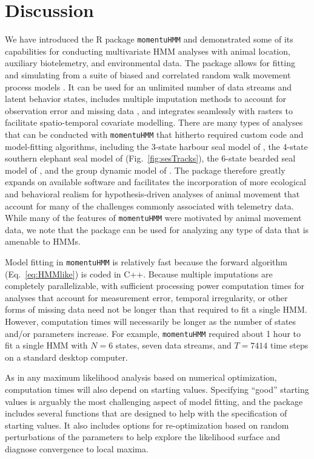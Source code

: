 \documentclass[12pt]{article}\usepackage[]{graphicx}\usepackage[]{color}
\begin{document}
\section{Discussion}
\label{sec:discuss}
We have introduced the R package \verb|momentuHMM| and demonstrated some of its capabilities for conducting multivariate HMM analyses with animal location, auxiliary biotelemetry, and environmental data. The package allows for fitting and simulating from a suite of biased and correlated random walk movement process models \citep[e.g.][]{McClintockEtAl2012}. It can be used for an unlimited number of data streams and latent behavior states, includes multiple imputation methods to account for observation error and missing data%
, and integrates seamlessly with rasters to facilitate spatio-temporal covariate modelling. There are many types of analyses that can be conducted with \verb|momentuHMM| that hitherto required custom code and model-fitting algorithms, including the 3-state harbour seal model of \cite{McClintockEtAl2013c}, the 4-state southern elephant seal model of \cite{MichelotEtAl2017} (Fig.\ \ref{fig:sesTracks}), the 6-state bearded seal model of \cite{McClintockEtAl2017}, and the group dynamic model of \cite{LangrockEtAl2014}. The package therefore greatly expands on available software and facilitates the incorporation of more ecological and behavioral realism for hypothesis-driven analyses of animal movement that account for many of the challenges commonly associated with telemetry data. While many of the features of \verb|momentuHMM| were motivated by animal movement data, we note that the package can be used for analyzing any type of data that is amenable to HMMs.

Model fitting in \verb|momentuHMM| is relatively fast because the forward algorithm (Eq.\ \ref{eq:HMMlike}) is coded in C++. Because multiple imputations are completely parallelizable, with sufficient processing power computation times for analyses that account for measurement error, temporal irregularity, or other forms of missing data need not be longer than that required to fit a single HMM.  However, computation times will necessarily be longer as the number of states and/or parameters increase. For example, \verb|momentuHMM| required about 1 hour to fit a single HMM with $N=6$ states, seven data streams, and $T=7414$ time steps \citep{McClintock2017} on a standard desktop computer.

As in any maximum likelihood analysis based on numerical optimization, computation times will also depend on starting values. Specifying ``good'' starting values is arguably the most challenging aspect of model fitting, and the package includes several functions that are designed to help with the specification of starting values. It also includes options for re-optimization based on random perturbations of the parameters to help explore the likelihood surface and diagnose convergence to local maxima. %
\end{document}
